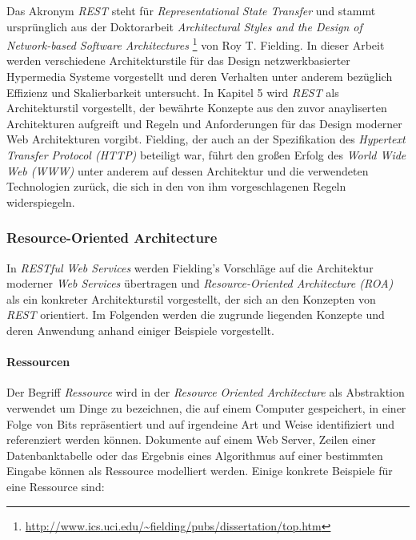 Das Akronym \textit{REST} steht für \textit{Representational State
  Transfer} und stammt ursprünglich aus der Doktorarbeit
\textit{Architectural Styles and the Design of Network-based Software
  Architectures} \cite{Fielding2000}
\footnote{\url{http://www.ics.uci.edu/~fielding/pubs/dissertation/top.htm}}
von Roy T. Fielding. In dieser Arbeit werden verschiedene
Architekturstile für das Design netzwerkbasierter Hypermedia Systeme
vorgestellt und deren Verhalten unter anderem bezüglich Effizienz und
Skalierbarkeit untersucht. In Kapitel 5 wird \textit{REST} als
Architekturstil vorgestellt, der bewährte Konzepte aus den zuvor
anayliserten Architekturen aufgreift und Regeln und Anforderungen für
das Design moderner Web Architekturen vorgibt. Fielding, der auch an
der Spezifikation des \textit{Hypertext Transfer Protocol (HTTP)}
 beteiligt war, führt
den großen Erfolg des \textit{World Wide Web (WWW)}
 unter anderem auf dessen
Architektur und die verwendeten Technologien zurück, die sich in den
von ihm vorgeschlagenen Regeln widerspiegeln.

\subsubsection{Resource-Oriented Architecture}

In \textit{RESTful Web Services} \cite{Richardson07} werden Fielding's
Vorschläge auf die Architektur moderner \textit{Web Services}
übertragen und \textit{Resource-Oriented Architecture (ROA)} als ein
konkreter Architekturstil vorgestellt, der sich an den Konzepten von
\textit{REST} orientiert. Im Folgenden werden die zugrunde liegenden
Konzepte und deren Anwendung anhand einiger Beispiele vorgestellt.

\paragraph{Ressourcen}
Der Begriff \textit{Ressource} wird in der \textit{Resource Oriented
  Architecture} als Abstraktion verwendet um Dinge zu bezeichnen, die
auf einem Computer gespeichert, in einer Folge von Bits repräsentiert
und auf irgendeine Art und Weise identifiziert und referenziert werden
können. Dokumente auf einem Web Server, Zeilen einer Datenbanktabelle
oder das Ergebnis eines Algorithmus auf einer bestimmten Eingabe
können als Ressource modelliert werden. Einige konkrete Beispiele für
eine Ressource sind:


